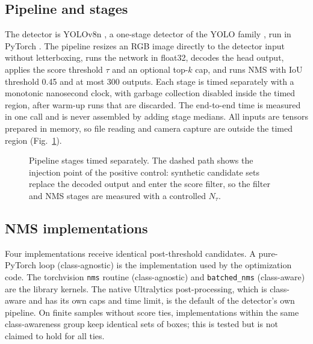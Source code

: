 \documentclass[a4paper,fleqn]{cas-dc}
\begin{document}
\subsection{Pipeline and stages}
The detector is YOLOv8n \cite{jocher2023ultralytics}, a one-stage detector of the YOLO family \cite{redmon2016yolo}, run in PyTorch \cite{paszke2019pytorch}. The pipeline resizes an RGB image directly to the detector input without letterboxing, runs the network in float32, decodes the head output, applies the score threshold $\tau$ and an optional top-$k$ cap, and runs NMS with IoU threshold 0.45 and at most 300 outputs. Each stage is timed separately with a monotonic nanosecond clock, with garbage collection disabled inside the timed region, after warm-up runs that are discarded. The end-to-end time is measured in one call and is never assembled by adding stage medians. All inputs are tensors prepared in memory, so file reading and camera capture are outside the timed region (Fig.~\ref{fig:pipeline}).


\begin{figure}[t]
\centering
{}
\caption{Pipeline stages timed separately. The dashed path shows the injection point of the positive control: synthetic candidate sets replace the decoded output and enter the score filter, so the filter and NMS stages are measured with a controlled $N_\tau$.}
\label{fig:pipeline}
\end{figure}

\subsection{NMS implementations}
Four implementations receive identical post-threshold candidates. A pure-PyTorch loop (class-agnostic) is the implementation used by the optimization code. The torchvision \texttt{nms} routine (class-agnostic) and \texttt{batched\_nms} (class-aware) are the library kernels. The native Ultralytics post-processing, which is class-aware and has its own caps and time limit, is the default of the detector's own pipeline. On finite samples without score ties, implementations within the same class-awareness group keep identical sets of boxes; this is tested but is not claimed to hold for all ties.
\end{document}
